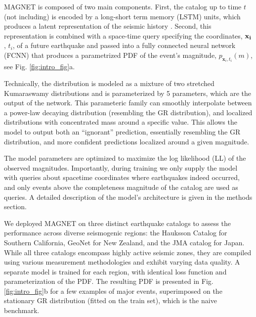 \documentclass[pdflatex]{sn-jnl}
\begin{document}
MAGNET is composed of two main components. First, the catalog up to time $t$ (not including) is encoded by a long-short term memory (LSTM) units, which produces a latent representation of the seismic history \cite{hochreiter_long_1997}.
Second, this representation is combined with a space-time query specifying the coordinates, $\bf{x}_i$, $t_i$, of a future earthquake and passed into a fully connected neural network (FCNN) that produces a parametrized PDF of the event's magnitude, $p_{\textbf{x}_i, t_i}(m)$, see Fig. \ref{fig:intro_fig}a. 

Technically, the distribution is modeled as a mixture of two stretched Kumaraswamy distributions \cite{kumaraswamy_generalized_1980} and is parameterized by 5 parameters, which are the output of the network. This parameteric family can  smoothly interpolate between a power-law decaying distribution (resembling the GR distribution), and localized distributions with concentrated mass around a specific value. This allows the model to output both an ``ignorant'' prediction, essentially resembling the GR distribution, and more confident predictions localized around a given magnitude.

The model parameters are optimized to maximize the log likelihood (LL) of the observed magnitudes. Importantly, during training we only supply the model with queries about spacetime coordinates where earthquakes indeed occurred, and only events above the completeness magnitude of the catalog are used as queries. A detailed description of the model's architecture is given in the methods section.


We deployed MAGNET on three distinct earthquake catalogs to assess the performance across diverse seismogenic regions: the Hauksson Catalog \cite{hauksson_waveform_2012} for Southern California, GeoNet \cite{gns_geonet_1970} for New Zealand, and the JMA catalog \cite{noauthor_japan_nodate} for Japan. While all three catalogs encompass highly active seismic zones, they are compiled using various measurement methodologies and exhibit varying data quality. A separate model is trained for each region, with identical loss function and parameterization of the PDF. The resulting PDF is presented in Fig. \ref{fig:intro_fig}b for a few examples of major events, superimposed on the stationary GR distribution (fitted on the train set), which is the naive benchmark.
\end{document}
